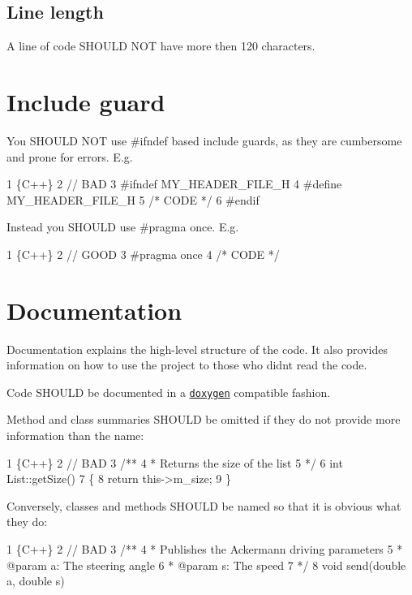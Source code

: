 \subsection*{Line length}

A line of code S\+H\+O\+U\+LD N\+OT have more then 120 characters.

\section*{Include guard}

You S\+H\+O\+U\+LD N\+OT use {\ttfamily \#ifndef} based include guards, as they are cumbersome and prone for errors. E.\+g. 
\begin{DoxyCode}
1 \{C++\}
2 // BAD
3 #ifndef MY\_HEADER\_FILE\_H
4 #define MY\_HEADER\_FILE\_H
5 /* CODE */
6 #endif
\end{DoxyCode}
 Instead you S\+H\+O\+U\+LD use {\ttfamily \#pragma once}. E.\+g. 
\begin{DoxyCode}
1 \{C++\}
2 // GOOD
3 #pragma once
4 /* CODE */
\end{DoxyCode}


\section*{Documentation}

Documentation explains the high-\/level structure of the code. It also provides information on how to use the project to those who didn\textquotesingle{}t read the code.

Code S\+H\+O\+U\+LD be documented in a \href{http://www.doxygen.nl/manual/docblocks.html}{\tt doxygen} compatible fashion.

Method and class summaries S\+H\+O\+U\+LD be omitted if they do not provide more information than the name\+:


\begin{DoxyCode}
1 \{C++\}
2 // BAD
3 /**
4  *  Returns the size of the list
5  */
6 int List::getSize()
7 \{
8     return this->m\_size;
9 \}
\end{DoxyCode}


Conversely, classes and methods S\+H\+O\+U\+LD be named so that it is obvious what they do\+:


\begin{DoxyCode}
1 \{C++\}
2 // BAD
3 /**
4  *   Publishes the Ackermann driving parameters
5  *   @param a: The steering angle
6  *   @param s: The speed
7  */
8 void send(double a, double s)
\end{DoxyCode}



